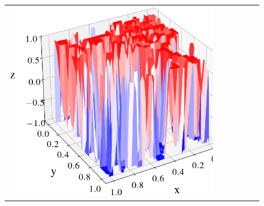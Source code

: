 \documentclass[12pt, reqno]{report}
\theoremstyle{definition}
\theoremstyle{remark}
\begin{document}
\begin{figure}[H]
\begin{tabular}{rccccc}
        \includegraphics[align = c, height=\subheight]{media_paper/end_AC_surf_MD_n=1000.png} \\


\end{tabular}
\end{figure}
\end{document}
